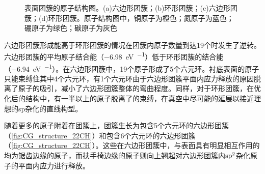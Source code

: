     \begin{figure}\ContinuedFloat
        \caption{表面团簇的原子结构图。(a)六边形团簇；(b)环形团簇；(c)六边形团簇；(d)环形团簇。原子结构图中，铜原子为橙色；氮原子为蓝色；硼原子为绿色；碳原子为灰色}
        \label{fig:CG_CG_structure_14-19C}
    \end{figure}


    六边形团簇形成能高于环形团簇的情况在团簇内原子数量到达19个时发生了逆转。六边形团簇的平均原子结合能（\SI{-6.98}{\electronvolt\per\atom}）低于环形团簇的结合能（\SI{-6.94}{\electronvolt\per\atom}）。在六边形团簇中，19个原子形成了5个六元环。衬底表面的原子只能束缚住其中4个六元环，有1个六元环由于六边形团簇平面内应力释放的原因脱离了原子的吸引，减小了六边形团簇整体的弯曲程度。同样，对于环形团簇，在优化后的结构中，有一半以上的原子脱离了的束缚，在真空中尽可能的延展以接近理想的sp杂化的直线构型。

    随着更多的原子附着在团簇上，团簇生长为包含5个六元环的六边形团簇（\ref{fig:CG_structure_22CH}）和包含6个六元环的六边形团簇（\ref{fig:CG_structure_22CH}）。这些在六边形团簇中，与表面具有明显相互作用的均为锯齿边缘的原子，而扶手椅边缘的原子则向上翘起对六边形团簇内$\rm sp^2$杂化原子的平面内应力进行释放。
    


